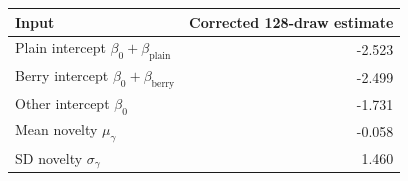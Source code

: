 \begin{tabular}{lr}\toprule
Input & Corrected 128-draw estimate\\\midrule
Plain intercept $\beta_0+\beta_{\mathrm{plain}}$ & -2.523 \\
Berry intercept $\beta_0+\beta_{\mathrm{berry}}$ & -2.499 \\
Other intercept $\beta_0$ & -1.731 \\
Mean novelty $\mu_\gamma$ & -0.058 \\
SD novelty $\sigma_\gamma$ & 1.460 \\
\bottomrule\end{tabular}
